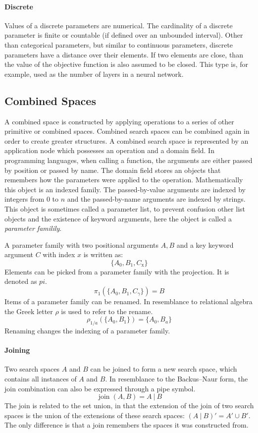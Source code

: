 \documentclass[english]{article}
\begin{document}
\paragraph{Discrete}
Values of a discrete parameters are numerical. The cardinality of a discrete parameter is finite or countable (if defined over an unbounded interval).
Other than categorical parameters, but similar to continuous parameters, discrete parameters have a distance over their elements. If two elements are close, than the value of the objective function is also assumed to be closed. This type is, for example, used as the number of layers in a neural network.

\subsection{Combined Spaces}
A combined space is constructed by applying operations to a series of other primitive or combined spaces. Combined search spaces can be combined again in order to create greater structures. A combined search space is represented by an application node which possesses an operation and a domain field. In programming languages, when calling a function, the arguments are either passed by position or passed by name. The domain field stores an objects that remembers how the parameters were applied to the operation. Mathematically this object is an indexed family. The passed-by-value arguments are indexed by integers from $0$ to $n$ and the passed-by-name arguments are indexed by strings. This object is sometimes called a parameter list, to prevent confusion other list objects and the existence of keyword arguments, here the object is called a \textit{parameter familily}.

A parameter family with two positional arguments $A,B$ and a key keyword argument $C$ with index $x$ is written as:
$$\{A_0, B_1, C_{\text{x}}\}$$
Elements can be picked from a parameter family with the projection. It is denoted as $pi$.
$$\pi_1(\{A_0, B_1, C_\gamma\}) = B$$
Items of a parameter family can be renamed. In resemblance to relational algebra the Greek letter $\rho$ is used to refer to the rename.
$$\rho_{1/a}(\{A_{0}, B_{1}\}) = \{A_{0}, B_{a}\}$$
Renaming changes the indexing of a parameter family.

\paragraph{Joining}
Two search spaces $A$ and $B$ can be joined to form a new search space, which contains all instances of $A$ and $B$. In resemblance to the Backus–Naur form, the join combination can also be expressed through a pipe symbol.
$$ \operatorname{join}(A, B) = A\ |\ B $$
The join is related to the set union, in that the extension of the join of two search spaces is the union of the extensions of these search spaces: $(A\ |\ B)' = A' \cup B'$. The only difference is that a join remembers the spaces it was constructed from.
\end{document}
